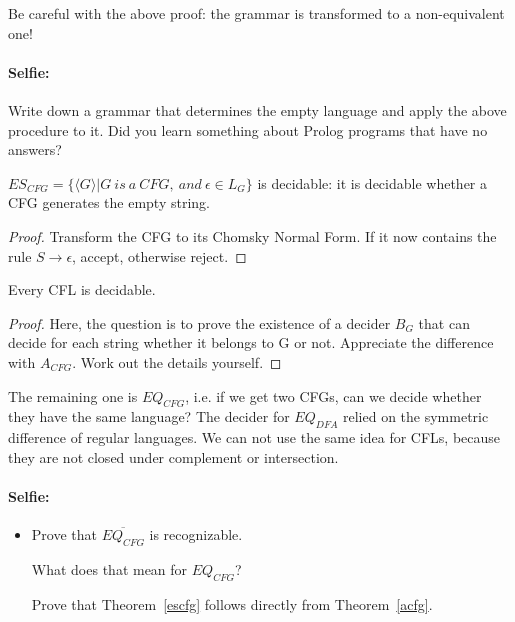 Be careful with the above proof: the grammar is transformed to a
non-equivalent one!


\paragraph{Selfie:}
Write down a grammar that determines the empty language and apply the
above procedure to it. Did you learn something about Prolog programs
that have no answers?

\begin{theorem} \label{escfg}
$ES_{CFG} = \{\langle G \rangle|G~is~a~CFG,~and~\epsilon \in L_G\}$ is
    decidable: it is decidable whether a CFG generates the empty string.
\end{theorem}
\begin{proof}
Transform the CFG to its Chomsky Normal Form. If it now contains the
rule $S \rightarrow \epsilon$, accept, otherwise reject.
\end{proof}

\begin{theorem}
Every CFL is decidable.
\end{theorem}
\begin{proof}
Here, the question is to prove the existence of a decider $B_G$ that
can decide for each string whether it belongs to G or not. Appreciate
the difference with $A_{CFG}$. Work out the details yourself.
\end{proof}

The remaining one is $EQ_{CFG}$, i.e. if we get two CFGs, can we
decide whether they have the same language? The decider for $EQ_{DFA}$
relied on the symmetric difference of regular languages. We can not
use the same idea for CFLs, because they are not closed under
complement or intersection.

\paragraph{Selfie:}
\begin{itemize}
\item[]
Prove that $\overline{EQ_{CFG}}$ is recognizable.

What does that mean for $EQ_{CFG}$?

Prove that Theorem~\ref{escfg} follows directly from Theorem~\ref{acfg}.
\end{itemize}




